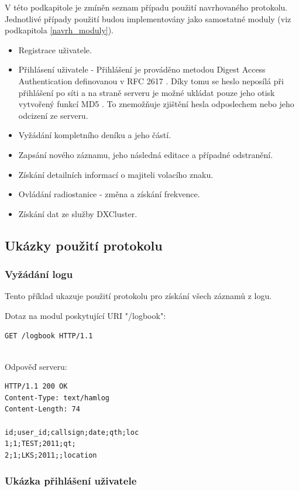 V této podkapitole je zmíněn seznam případu použití navrhovaného protokolu. Jednotlivé případy použití
budou implementovány jako samostatné moduly (viz podkapitola \ref{navrh_moduly}).

\begin{itemize}
\item Registrace uživatele.
\item Přihlásení uživatele - Přihlášení je prováděno metodou Digest Access Authentication definovanou v
RFC 2617 \cite{rfc2617}. Díky tomu se heslo neposílá při přihlášení po síti a na straně serveru je možné ukládat
pouze jeho otisk vytvořený funkcí MD5 \cite{md5}. To znemožňuje zjištění hesla odposlechem nebo jeho odcizení ze
serveru.
\item Vyžádání kompletního deníku a jeho částí.
\item Zapsání nového záznamu, jeho následná editace a případné odstranění.
\item Získání detailních informací o majiteli volacího znaku.
\item Ovládání radiostanice - změna a získání frekvence.
\item Získání dat ze služby DXCluster.
\end{itemize}

\subsection{Ukázky použití protokolu}

\subsubsection{Vyžádání logu}

Tento příklad ukazuje použití protokolu pro získání všech záznamů z logu.

Dotaz na modul poskytující URI "/logbook":
\begin{verbatim}
GET /logbook HTTP/1.1


\end{verbatim}
Odpověď serveru:
\begin{verbatim}
HTTP/1.1 200 OK
Content-Type: text/hamlog
Content-Length: 74

id;user_id;callsign;date;qth;loc
1;1;TEST;2011;qt;
2;1;LKS;2011;;location
\end{verbatim}

\subsubsection{Ukázka přihlášení uživatele}

